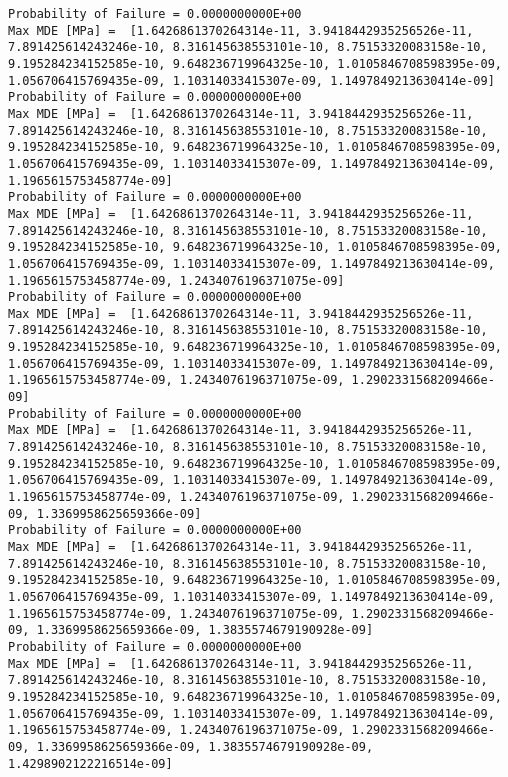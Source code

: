 \documentclass[11pt]{article}
\begin{document}
\begin{Verbatim}[commandchars=\\\{\}]
Probability of Failure = 0.0000000000E+00
Max MDE [MPa] =  [1.6426861370264314e-11, 3.9418442935256526e-11, 7.891425614243246e-10, 8.316145638553101e-10, 8.75153320083158e-10, 9.195284234152585e-10, 9.648236719964325e-10, 1.0105846708598395e-09, 1.056706415769435e-09, 1.10314033415307e-09, 1.1497849213630414e-09]
Probability of Failure = 0.0000000000E+00
Max MDE [MPa] =  [1.6426861370264314e-11, 3.9418442935256526e-11, 7.891425614243246e-10, 8.316145638553101e-10, 8.75153320083158e-10, 9.195284234152585e-10, 9.648236719964325e-10, 1.0105846708598395e-09, 1.056706415769435e-09, 1.10314033415307e-09, 1.1497849213630414e-09, 1.1965615753458774e-09]
Probability of Failure = 0.0000000000E+00
Max MDE [MPa] =  [1.6426861370264314e-11, 3.9418442935256526e-11, 7.891425614243246e-10, 8.316145638553101e-10, 8.75153320083158e-10, 9.195284234152585e-10, 9.648236719964325e-10, 1.0105846708598395e-09, 1.056706415769435e-09, 1.10314033415307e-09, 1.1497849213630414e-09, 1.1965615753458774e-09, 1.2434076196371075e-09]
Probability of Failure = 0.0000000000E+00
Max MDE [MPa] =  [1.6426861370264314e-11, 3.9418442935256526e-11, 7.891425614243246e-10, 8.316145638553101e-10, 8.75153320083158e-10, 9.195284234152585e-10, 9.648236719964325e-10, 1.0105846708598395e-09, 1.056706415769435e-09, 1.10314033415307e-09, 1.1497849213630414e-09, 1.1965615753458774e-09, 1.2434076196371075e-09, 1.2902331568209466e-09]
Probability of Failure = 0.0000000000E+00
Max MDE [MPa] =  [1.6426861370264314e-11, 3.9418442935256526e-11, 7.891425614243246e-10, 8.316145638553101e-10, 8.75153320083158e-10, 9.195284234152585e-10, 9.648236719964325e-10, 1.0105846708598395e-09, 1.056706415769435e-09, 1.10314033415307e-09, 1.1497849213630414e-09, 1.1965615753458774e-09, 1.2434076196371075e-09, 1.2902331568209466e-09, 1.3369958625659366e-09]
Probability of Failure = 0.0000000000E+00
Max MDE [MPa] =  [1.6426861370264314e-11, 3.9418442935256526e-11, 7.891425614243246e-10, 8.316145638553101e-10, 8.75153320083158e-10, 9.195284234152585e-10, 9.648236719964325e-10, 1.0105846708598395e-09, 1.056706415769435e-09, 1.10314033415307e-09, 1.1497849213630414e-09, 1.1965615753458774e-09, 1.2434076196371075e-09, 1.2902331568209466e-09, 1.3369958625659366e-09, 1.3835574679190928e-09]
Probability of Failure = 0.0000000000E+00
Max MDE [MPa] =  [1.6426861370264314e-11, 3.9418442935256526e-11, 7.891425614243246e-10, 8.316145638553101e-10, 8.75153320083158e-10, 9.195284234152585e-10, 9.648236719964325e-10, 1.0105846708598395e-09, 1.056706415769435e-09, 1.10314033415307e-09, 1.1497849213630414e-09, 1.1965615753458774e-09, 1.2434076196371075e-09, 1.2902331568209466e-09, 1.3369958625659366e-09, 1.3835574679190928e-09, 1.4298902122216514e-09]

\end{Verbatim}
\end{document}
